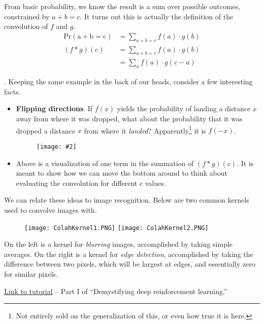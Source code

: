 \documentclass[12pt]{article}
\newcommand\myfig[2][0.3\textwidth]{\begin{figure}[h!]\centering\texttt{[image: \#2]}\end{figure}}
\newcommand{\myspace}{\vspace{2\bigskipamount}}
\newcommand\p{\Needspace{10\baselineskip} \noindent}
\begin{document}
From basic probability, we know the result is a sum over possible outcomes, constrained by $a + b = c$. It turns out this is actually the definition of the convolution of $f$ and $g$. 
\begin{align}
	\mathrm{Pr(a + b = c)} &= \sum_{a + b = c} f(a) \cdot g(b) \\
	(f * g)(c) &= \sum_{a + b = c} f(a) \cdot g(b)\\
	&= \sum_a f(a) \cdot g(c - a)
\end{align}

\myspace
\p {}. Keeping the same example in the back of our heads, consider a few interesting facts. 
\begin{itemize}
	\item \textbf{Flipping directions}. If $f(x)$ yields the probability of landing a distance $x$ away from where it was dropped, what about the probability that it was dropped a distance $x$ from where it \textit{landed}? Apparently\footnote{Not entirely sold on the generalization of this, or even how true it is here.} it is $f(-x)$. 
	
	\myfig[0.3\textwidth]{ColahBall2.PNG}
	
	\item Above is a visualization of one term in the summation of $(f * g)(c)$. It is meant to show how we can move the bottom around to think about evaluating the convolution for different $c$ values. 
\end{itemize}
We can relate these ideas to image recognition. Below are two common kernels used to convolve images with. 
\begin{figure}[h!]
	\centering
	\texttt{[image: ColahKernel1.PNG]}
	\hspace{2.5cm}
	\texttt{[image: ColahKernel2.PNG]}
\end{figure}

On the left is a kernel for \textit{blurring} images, accomplished by taking simple averages. On the right is a kernel for \textit{edge detection}, accomplished by taking the difference between two pixels, which will be largest at edges, and essentially zero for similar pixels.



\href{https://www.nervanasys.com/demystifying-deep-reinforcement-learning/}{Link to tutorial} -- Part I of ``Demystifying deep reinforcement learning.'' \\
\end{document}
